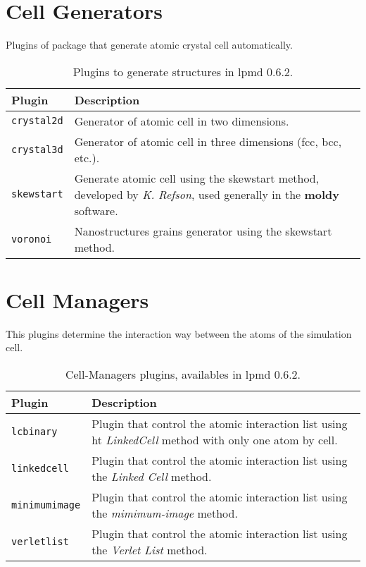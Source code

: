 \section{Cell Generators}
Plugins of {\lpmd} package that generate atomic crystal cell automatically.

\begin{table}[h!]\centering
 \begin{tabular}{|l|p{13cm}|}\hline
 Plugin & Description \\
 \hline\hline
 \texttt{crystal2d} & Generator of atomic cell in two dimensions.\\
 \hline
 \texttt{crystal3d} & Generator of atomic cell in three dimensions (fcc,
         bcc, etc.).\\
 \hline
 \texttt{skewstart} & Generate atomic cell using the  skewstart method,
 developed by \textit{K. Refson}, used generally in the \textbf{moldy}
 software.\\
 \hline
 \texttt{voronoi} & Nanostructures grains generator using the skewstart
 method.\\
 \hline
 \end{tabular}
\label{tab:cellgen}
\caption{Plugins to generate structures in lpmd 0.6.2.}
\end{table}

\section{Cell Managers}
This plugins determine the interaction way between the atoms of the simulation
cell.

\begin{table}[h!]\centering
 \begin{tabular}{|l|p{13cm}|}\hline
 Plugin & Description \\
 \hline\hline
 \texttt{lcbinary} & Plugin that control the atomic interaction list using ht
 \textit{LinkedCell} method with only one atom by cell.\\
 \hline
 \texttt{linkedcell} & Plugin that control the atomic interaction list using the
 \textit{Linked Cell} method.\\
 \hline
 \texttt{minimumimage} & Plugin that control the atomic interaction list using
the \textit{mimimum-image} method.\\
 \hline
 \texttt{verletlist} & Plugin that control the atomic interaction list using
the \textit{Verlet List} method.\\
 \hline
 \end{tabular}
\label{tab:modmanager}
\caption{Cell-Managers plugins, availables in lpmd 0.6.2.}
\end{table}

